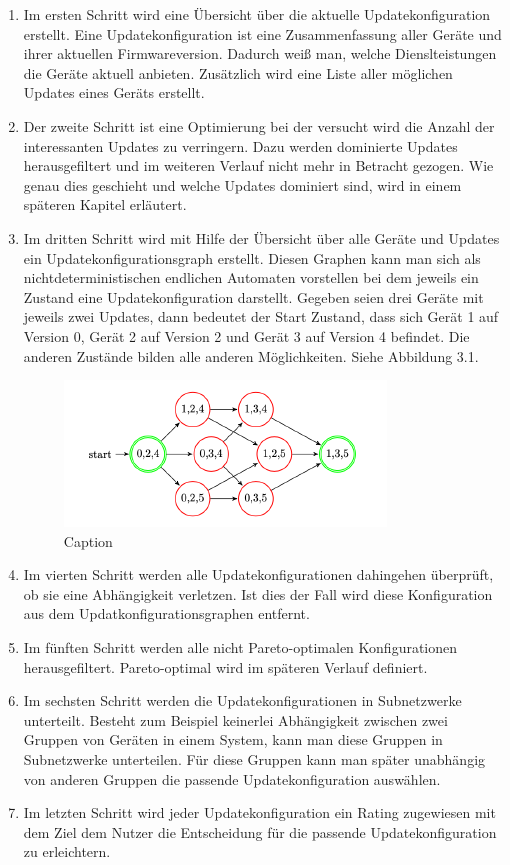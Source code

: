 \begin{enumerate}
\item Im ersten Schritt wird eine Übersicht über die aktuelle Updatekonfiguration erstellt. Eine Updatekonfiguration ist eine Zusammenfassung
aller Geräte und ihrer aktuellen Firmwareversion. Dadurch weiß man, welche Dienslteistungen die Geräte aktuell anbieten. Zusätzlich wird eine Liste
aller möglichen Updates eines Geräts erstellt. 
\item Der zweite Schritt ist eine Optimierung bei der versucht wird die Anzahl der interessanten Updates zu verringern. Dazu werden dominierte 
Updates herausgefiltert und im weiteren Verlauf nicht mehr in Betracht gezogen. Wie genau dies geschieht und welche Updates dominiert sind, wird
in einem späteren Kapitel erläutert.
\item Im dritten Schritt wird mit Hilfe der Übersicht über alle Geräte und Updates ein Updatekonfigurationsgraph erstellt. Diesen Graphen kann man
sich als nichtdeterministischen endlichen Automaten vorstellen bei dem jeweils ein Zustand eine Updatekonfiguration darstellt. Gegeben seien drei 
Geräte mit jeweils zwei Updates, dann bedeutet der Start Zustand, dass sich Gerät 1 auf Version 0, Gerät 2 auf Version 2 und Gerät 3 auf Version 4
befindet. Die anderen Zustände bilden alle anderen Möglichkeiten. Siehe Abbildung 3.1.
\begin{figure}[h]
\centering
\includegraphics{"UCG"}
\caption{Caption}
\label{fig:Prob1:MEA}
\end{figure}
\item Im vierten Schritt werden alle Updatekonfigurationen dahingehen überprüft, ob sie eine Abhängigkeit verletzen. Ist dies der Fall wird diese
Konfiguration aus dem Updatkonfigurationsgraphen entfernt.
\item Im fünften Schritt werden alle nicht Pareto-optimalen Konfigurationen herausgefiltert. Pareto-optimal wird im späteren Verlauf definiert.
\item Im sechsten Schritt werden die Updatekonfigurationen in Subnetzwerke unterteilt. Besteht zum Beispiel keinerlei Abhängigkeit zwischen zwei
Gruppen von Geräten in einem System, kann man diese Gruppen in Subnetzwerke unterteilen. Für diese Gruppen kann man später unabhängig von
anderen Gruppen die passende Updatekonfiguration auswählen.
\item Im letzten Schritt wird jeder Updatekonfiguration ein Rating zugewiesen mit dem Ziel dem Nutzer die Entscheidung für die passende
Updatekonfiguration zu erleichtern.
\end{enumerate}


